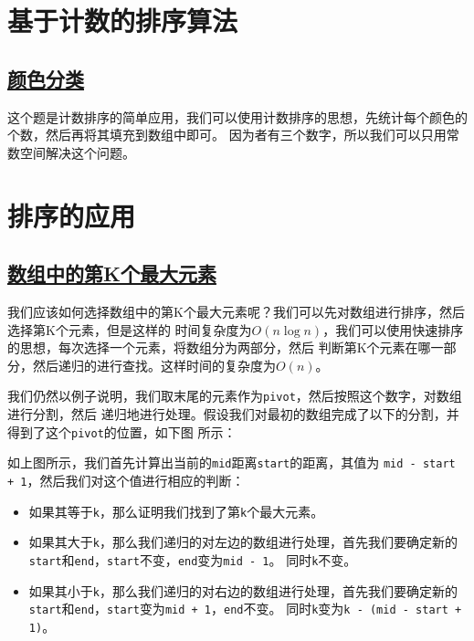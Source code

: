 \documentclass[../../main.tex]{subfiles}
\begin{document}


\section{基于计数的排序算法}

\subsection{\href{https://leetcode.cn/problems/sort-colors/}{颜色分类}}

这个题是计数排序的简单应用，我们可以使用计数排序的思想，先统计每个颜色的个数，然后再将其填充到数组中即可。
因为者有三个数字，所以我们可以只用常数空间解决这个问题。



\section{排序的应用}

\subsection{\href{https://leetcode.cn/problems/kth-largest-element-in-an-array/}
{数组中的第K个最大元素}}

我们应该如何选择数组中的第K个最大元素呢？我们可以先对数组进行排序，然后选择第K个元素，但是这样的
时间复杂度为$O(n\log n)$，我们可以使用快速排序的思想，每次选择一个元素，将数组分为两部分，然后
判断第K个元素在哪一部分，然后递归的进行查找。这样时间的复杂度为$O(n)$。

我们仍然以例子说明，我们取末尾的元素作为\texttt{pivot}，然后按照这个数字，对数组进行分割，然后
递归地进行处理。假设我们对最初的数组完成了以下的分割，并得到了这个\texttt{pivot}的位置，如下图
所示：


如上图所示，我们首先计算出当前的\texttt{mid}距离\texttt{start}的距离，其值为
\texttt{mid - start + 1}，然后我们对这个值进行相应的判断：

\begin{itemize}
  \item 如果其等于\texttt{k}，那么证明我们找到了第\texttt{k}个最大元素。
  \item 如果其大于\texttt{k}，那么我们递归的对左边的数组进行处理，首先我们要确定新的
  \texttt{start}和\texttt{end}，\texttt{start}不变，\texttt{end}变为\texttt{mid - 1}。
  同时\texttt{k}不变。
  \item 如果其小于\texttt{k}，那么我们递归的对右边的数组进行处理，首先我们要确定新的
  \texttt{start}和\texttt{end}，\texttt{start}变为\texttt{mid + 1}，\texttt{end}不变。
  同时\texttt{k}变为\texttt{k - (mid - start + 1)}。
\end{itemize}
\end{document}
